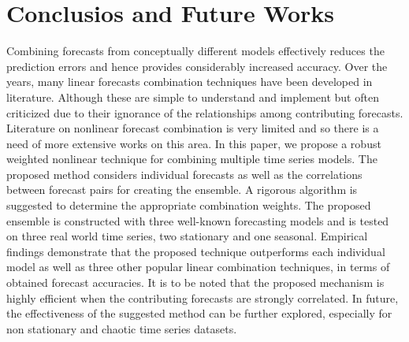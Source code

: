 \section{ Conclusios and Future Works}


Combining forecasts from conceptually different models effectively reduces the prediction errors and hence provides
considerably increased accuracy. Over the years, many linear forecasts combination techniques have been developed in literature. Although these are simple to understand and implement but often criticized due to their ignorance of the relationships among contributing forecasts. Literature on nonlinear forecast combination is very limited and so there is a need of more extensive works on this area. In this paper, we propose a robust weighted nonlinear
technique for combining multiple time series models. The proposed method considers individual forecasts as well as the correlations between forecast pairs for creating the ensemble. A rigorous algorithm is suggested to determine the appropriate combination weights. The proposed ensemble is constructed with three well-known forecasting models and is tested on three real world time series, two stationary and one seasonal. Empirical findings demonstrate that the proposed technique outperforms each individual model as well as three other popular linear combination techniques, in terms of obtained forecast accuracies. It is to be noted that the proposed mechanism is highly efficient when the contributing forecasts are strongly correlated. In future, the effectiveness of the suggested method can be further explored, especially for non stationary and chaotic time series datasets. 
